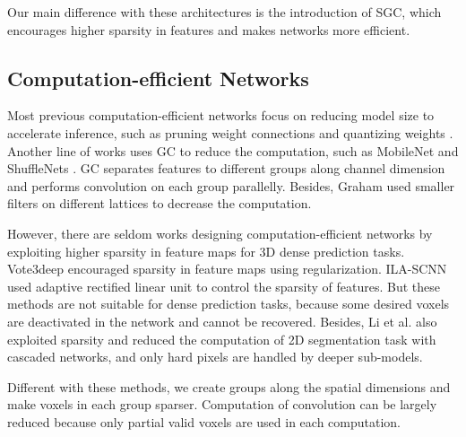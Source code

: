 \documentclass[runningheads]{llncs}
\begin{document}
Our main difference with these architectures is the introduction of SGC, which encourages higher sparsity in features and makes networks more efficient.

\subsection{Computation-efficient Networks}
Most previous computation-efficient networks focus on reducing model size to accelerate inference, such as pruning weight connections \cite{LeCun:1989:OBD,han2015learning} and quantizing weights \cite{gong2014compressing}.
Another line of works uses GC to reduce the computation, such as MobileNet \cite{2017arXiv170404861H} and ShuffleNets \cite{zhang2018shufflenet}. GC separates features to different groups along channel dimension and performs convolution on each group parallelly. Besides, Graham \cite{Graham2015} used smaller filters on different lattices to decrease the computation.

However, there are seldom works designing computation-efficient networks by exploiting higher sparsity in feature maps for 3D dense prediction tasks. Vote3deep \cite{engelcke2017vote3deep} encouraged sparsity in feature maps using  regularization. ILA-SCNN \cite{hackel2018inference} used adaptive rectified linear unit to control the sparsity of features. But these methods are not suitable for dense prediction tasks, because some desired voxels are deactivated in the network and cannot be recovered. Besides, Li et al. \cite{2017arXiv170401344L} also exploited sparsity and reduced the computation of 2D segmentation task with cascaded networks, and only hard pixels are handled by deeper sub-models.

Different with these methods, we create groups along the spatial dimensions and make voxels in each group sparser. Computation of convolution can be largely reduced because only partial valid voxels are used in each computation.
\end{document}
